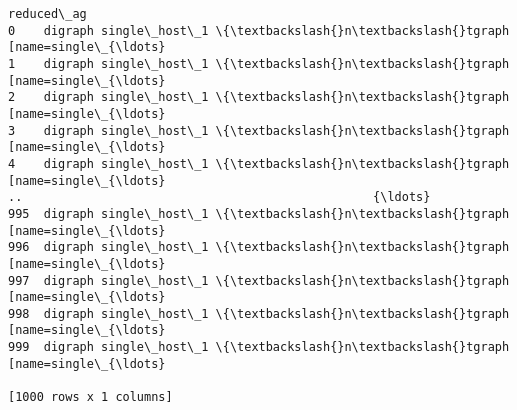 \documentclass[11pt]{article}
\makeatletter
\newcommand{\boxspacing}{\kern\kvtcb@left@rule\kern\kvtcb@boxsep}
\newcommand{\prompt}[4]{
        \ttfamily\llap{{\color{#2}[#3]:\hspace{3pt}#4}}\vspace{-\baselineskip}
    }
\makeatother
\begin{document}
            \begin{tcolorbox}[breakable, size=fbox, boxrule=.5pt, pad at break*=1mm, opacityfill=0]
\prompt{Out}{outcolor}{6}{\boxspacing}
\begin{Verbatim}[commandchars=\\\{\}]
                                            reduced\_ag
0    digraph single\_host\_1 \{\textbackslash{}n\textbackslash{}tgraph [name=single\_{\ldots}
1    digraph single\_host\_1 \{\textbackslash{}n\textbackslash{}tgraph [name=single\_{\ldots}
2    digraph single\_host\_1 \{\textbackslash{}n\textbackslash{}tgraph [name=single\_{\ldots}
3    digraph single\_host\_1 \{\textbackslash{}n\textbackslash{}tgraph [name=single\_{\ldots}
4    digraph single\_host\_1 \{\textbackslash{}n\textbackslash{}tgraph [name=single\_{\ldots}
..                                                 {\ldots}
995  digraph single\_host\_1 \{\textbackslash{}n\textbackslash{}tgraph [name=single\_{\ldots}
996  digraph single\_host\_1 \{\textbackslash{}n\textbackslash{}tgraph [name=single\_{\ldots}
997  digraph single\_host\_1 \{\textbackslash{}n\textbackslash{}tgraph [name=single\_{\ldots}
998  digraph single\_host\_1 \{\textbackslash{}n\textbackslash{}tgraph [name=single\_{\ldots}
999  digraph single\_host\_1 \{\textbackslash{}n\textbackslash{}tgraph [name=single\_{\ldots}

[1000 rows x 1 columns]
\end{Verbatim}
\end{tcolorbox}
        
\end{document}
